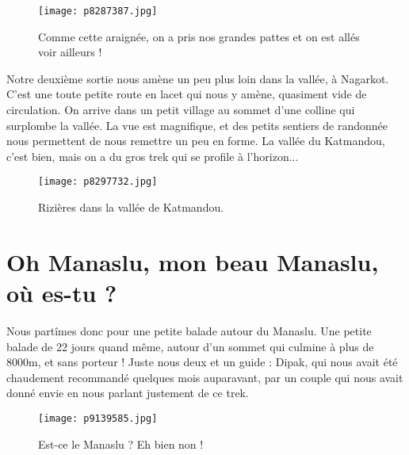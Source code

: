 \documentclass{book}
\begin{document}
\begin{figure}[h]
\centering
\texttt{[image: p8287387.jpg]}
\caption*{Comme cette araignée, on a pris nos grandes pattes et on est allés voir ailleurs !}
\end{figure}

Notre deuxième sortie nous amène un peu plus loin dans la vallée, à Nagarkot. C'est une toute petite route en lacet qui nous y amène, quasiment vide de circulation. On arrive dans un petit village au sommet d'une colline qui surplombe la vallée. La vue est magnifique, et des petits sentiers de randonnée nous permettent de nous remettre un peu en forme. La vallée du Katmandou, c'est bien, mais on a du gros trek qui se profile à l'horizon...


\begin{figure}[h]
\centering
\texttt{[image: p8297732.jpg]}
\caption*{Rizières dans la vallée de Katmandou.}
\end{figure}



\chapter{Oh Manaslu, mon beau Manaslu, où es-tu ?}
Nous partîmes donc pour une petite balade autour du Manaslu. Une petite balade de 22 jours quand même, autour d'un sommet qui culmine à plus de 8000m, et sans porteur ! Juste nous deux et un guide : Dipak, qui nous avait été chaudement recommandé quelques mois auparavant, par un couple qui nous avait donné envie en nous parlant justement de ce trek.


\begin{figure}[h]
\centering
\texttt{[image: p9139585.jpg]}
\caption*{Est-ce le Manaslu ? Eh bien non !}
\end{figure}
\end{document}
